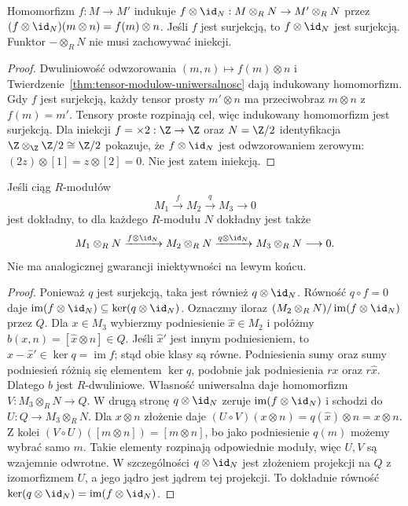 \begin{stwierdzenie}
\label{prop:tensor-maps-algebra}
Homomorfizm $f:M\to M'$ indukuje
$f\otimes\id_N:M\otimes_R N\to M'\otimes_R N$
przez $(f\otimes\id_N)(m\otimes n)=f(m)\otimes n$.
Jeśli $f$ jest surjekcją, to $f\otimes\id_N$
jest surjekcją. Funktor $-\otimes_R N$ nie musi
zachowywać iniekcji.
\end{stwierdzenie}
\begin{proof}
Dwuliniowość odwzorowania $(m,n)\mapsto f(m)\otimes n$
i Twierdzenie~\ref{thm:tensor-modulow-uniwersalnosc}
dają indukowany homomorfizm.
Gdy $f$ jest surjekcją, każdy tensor prosty
$m'\otimes n$ ma przeciwobraz $m\otimes n$
z $f(m)=m'$. Tensory proste rozpinają cel,
więc indukowany homomorfizm jest surjekcją.
Dla iniekcji $f=\times2:\Z\to\Z$ oraz
$N=\Z/2$ identyfikacja
$\Z\otimes_{\Z}\Z/2\cong\Z/2$ pokazuje,
że $f\otimes\id_N$ jest odwzorowaniem zerowym:
$(2z)\otimes[1]=z\otimes[2]=0$.
Nie jest zatem iniekcją.
\end{proof}

\begin{stwierdzenie}
\label{prop:tensor-prawostronnie-dokladny}
Jeśli ciąg $R$-modułów
\[
 M_1\xrightarrow{f}M_2\xrightarrow{q}M_3\longrightarrow0
\]
jest dokładny, to dla każdego $R$-modułu $N$ dokładny jest także
\[
 M_1\otimes_R N\xrightarrow{f\otimes\id_N}
 M_2\otimes_R N\xrightarrow{q\otimes\id_N}
 M_3\otimes_R N\longrightarrow0.
\]
Nie ma analogicznej gwarancji iniektywności na lewym końcu.
\end{stwierdzenie}
\begin{proof}
Ponieważ $q$ jest surjekcją, taka jest również $q\otimes\id_N$.
Równość $q\circ f=0$ daje
$\operatorname{im}(f\otimes\id_N)\subseteq\ker(q\otimes\id_N)$.
Oznaczmy iloraz $(M_2\otimes_R N)/\operatorname{im}(f\otimes\id_N)$
przez $Q$. Dla $x\in M_3$ wybierzmy podniesienie
$\widehat x\in M_2$ i połóżmy
$b(x,n)=[\widehat x\otimes n]\in Q$.
Jeśli $\widehat x'$ jest innym podniesieniem, to
$\widehat x-\widehat x'\in\ker q=\operatorname{im}f$;
stąd obie klasy są równe. Podniesienia sumy oraz
sumy podniesień różnią się elementem $\ker q$,
podobnie jak podniesienia $rx$ oraz $r\widehat x$.
Dlatego $b$ jest $R$-dwuliniowe. Własność uniwersalna
daje homomorfizm $V:M_3\otimes_R N\to Q$.
W drugą stronę $q\otimes\id_N$ zeruje
$\operatorname{im}(f\otimes\id_N)$ i schodzi do
$U:Q\to M_3\otimes_R N$.
Dla $x\otimes n$ złożenie daje
$(U\circ V)(x\otimes n)=q(\widehat x)\otimes n=x\otimes n$.
Z kolei $(V\circ U)([m\otimes n])=[m\otimes n]$,
bo jako podniesienie $q(m)$ możemy wybrać samo $m$.
Takie elementy rozpinają odpowiednie moduły,
więc $U,V$ są wzajemnie odwrotne.
W szczególności $q\otimes\id_N$ jest złożeniem projekcji
na $Q$ z izomorfizmem $U$, a jego jądro jest jądrem tej projekcji.
To dokładnie równość
$\ker(q\otimes\id_N)=\operatorname{im}(f\otimes\id_N)$.
\end{proof}

